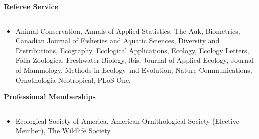 







\vspace{0.5cm}


{\large \bf Referee Service} \\
\rule[3mm]{\textwidth}{0.3mm}

\begin{itemize}
  \item[] Animal Conservation, Annals of Applied Statistics, The Auk,
    Biometrics, Canadian Journal of Fisheries and Aquatic Sciences,
    Diversity and Distributions, Ecography, Ecological Applications,
    Ecology, Ecology Letters, Folia Zoologica, Freshwater Biology,
    Ibis, Journal of Applied Ecology, Journal of Mammology, Methods in
    Ecology and Evolution, Nature Communications, Ornotholog\'{i}a
    Neotropical, PLoS One. 
\end{itemize}




\vspace{0.5cm}

{\large \bf Professional Memberships} \\
\rule[3mm]{\textwidth}{0.3mm}

\begin{itemize}
\item[] Ecological Society of America, American Ornithological 
  Society (Elective Member), The Wildlife Society
\end{itemize}





\vspace{0.5cm}

